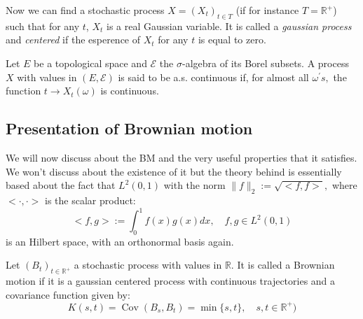 Now we can find a stochastic process $X=\left(X_{t}\right)_{t \in T}$ (if for instance $T=\mathbb{R^+}$) such that for any $t$, $X_{t}$ is a real Gaussian variable. It is called a \textit{gaussian process} and \textit{centered} if the esperence of $X_t$ for any $t$ is equal to zero.
\begin{definition}
	Let $E$ be a topological space and $\mathscr{E}$ the $\sigma$-algebra of its Borel subsets. A process $X$ with values in $(E, \mathscr{E})$ is said to be a.s. continuous if, for almost all $\omega^{\prime} s,$ the function $t \rightarrow X_{t}(\omega)$ is continuous.
\end{definition}

\subsection{Presentation of Brownian motion}
We will now discuss about the BM and the very useful properties that it satisfies. We won't discuss about the existence of it but the theory behind is essentially based about the fact that $L^{2}(0,1)$ with the norm $\|f\|_{2}:=\sqrt{<f, f>},$ where $<\cdot, \cdot>$ is the scalar product:
$$
<f, g>:=\int_{0}^{1} f(x) g(x) d x, \quad f, g \in L^{2}(0,1)
$$
is an Hilbert space, with an orthonormal basis again.

\begin{definition}
	Let $(B_t)_{t \in\mathbb{R^+}}$ a stochastic process with values in $\mathbb{R}$. It is called a Brownian motion if it is a gaussian centered process with continuous trajectories and a covariance function given by:
	\[
	K(s, t)=\operatorname{Cov}\left(B_{s}, B_{t}\right)=\min \{s, t\}, \quad s, t \in\mathbb{R^+})
	\]
\end{definition}


